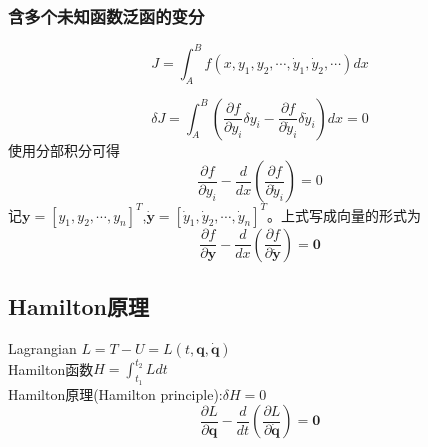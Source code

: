 \documentclass[12pt]{article}
\numberwithin{equation}{section}
\begin{document}
        \subsubsection{含多个未知函数泛函的变分}
        \begin{equation}
            J=\int_A^Bf(x,y_1,y_2,\cdots,\dot{y}_1,\dot{y}_2,\cdots)dx
        \end{equation}

        \begin{equation*}
            \delta J=\int_A^B\left(\frac{\partial f}{\partial y_i}\delta y_i-\frac{\partial f}{\partial \dot{y}_i}\delta \dot{y}_i\right)dx=0
        \end{equation*}
        使用分部积分可得
        \begin{equation}\label{mE-L}
            \frac{\partial f}{\partial y_i}-\frac{d}{dx}\left(\frac{\partial f}{\partial \dot{y}_i}\right)=0
        \end{equation}
        记$\mathbf{y}=[y_1,y_2,\cdots,y_n]^T$,$\mathbf{\dot{y}}=[\dot{y}_1,\dot{y}_2,\cdots,\dot{y}_n]^T$。上式写成向量的形式为
        \begin{equation}\label{vE-L}
            \frac{\partial f}{\partial \mathbf{y}}-\frac{d}{dx}\left(\frac{\partial f}{\partial \dot{\mathbf{y}}}\right)=\mathbf{0}
        \end{equation}
        \subsection{Hamilton原理}
        \noindent Lagrangian $L=T-U=L(t,\mathbf{q},\dot{\mathbf{q}})$\\
        Hamilton函数$H=\int_{t_1}^{t_2}Ldt$\\
        Hamilton原理(Hamilton principle):$\delta H=0$
        \begin{equation}\label{vLagrange}
            \frac{\partial L}{\partial \mathbf{q}}-\frac{d}{dt}\left(\frac{\partial L}{\partial \dot{\mathbf{q}}}\right)=\mathbf{0}
        \end{equation}
        
    
\end{document}
